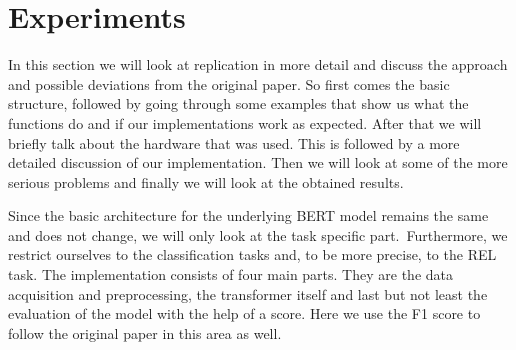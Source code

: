 \chapter{Experiments}
\label{chap:Experiments}
In this section we will look at replication in more detail and discuss the approach and possible deviations from the original paper. So first comes the basic structure, followed by going through some examples that show us what the functions do and if our implementations work as expected. After that we will briefly talk about the hardware that was used. This is followed by a more detailed discussion of our implementation. Then we will look at some of the more serious problems and finally we will look at the obtained results.

Since the basic architecture for the underlying BERT model remains the same and does not change, we will only look at the task specific part. Furthermore, we restrict ourselves to the classification tasks and, to be more precise, to the REL task. The implementation consists of four main parts. They are the data acquisition and preprocessing, the transformer itself and last but not least the evaluation of the model with the help of a score. Here we use the F1 score to follow the original paper in this area as well. 

